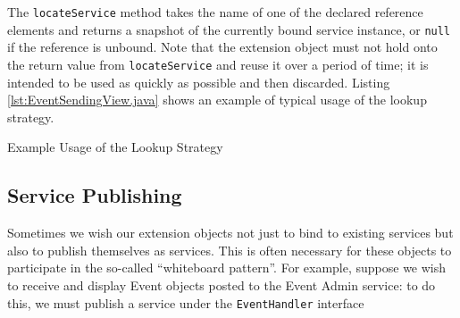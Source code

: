 \documentclass[12pt]{article}
\begin{document}
The \texttt{locateService} method takes the name of one of the declared reference
elements and returns a snapshot of the currently bound service instance, or
\texttt{null} if the reference is unbound. Note that the extension object must
not hold onto the return value from \texttt{locateService} and reuse it over a
period of time; it is intended to be used as quickly as possible and then
discarded. Listing \ref{lst:EventSendingView.java} shows an example of typical
usage of the lookup strategy.

\begin{program}

\caption{Example Usage of the Lookup Strategy}
\label{lst:EventSendingView.java}
\end{program}

\subsection{Service Publishing}

Sometimes we wish our extension objects not just to bind to existing services
but also to publish themselves as services. This is often necessary for these
objects to participate in the so-called ``whiteboard pattern''. For example,
suppose we wish to receive and display Event objects posted to the Event Admin
service: to do this, we must publish a service under the \texttt{EventHandler}
interface 
\end{document}
